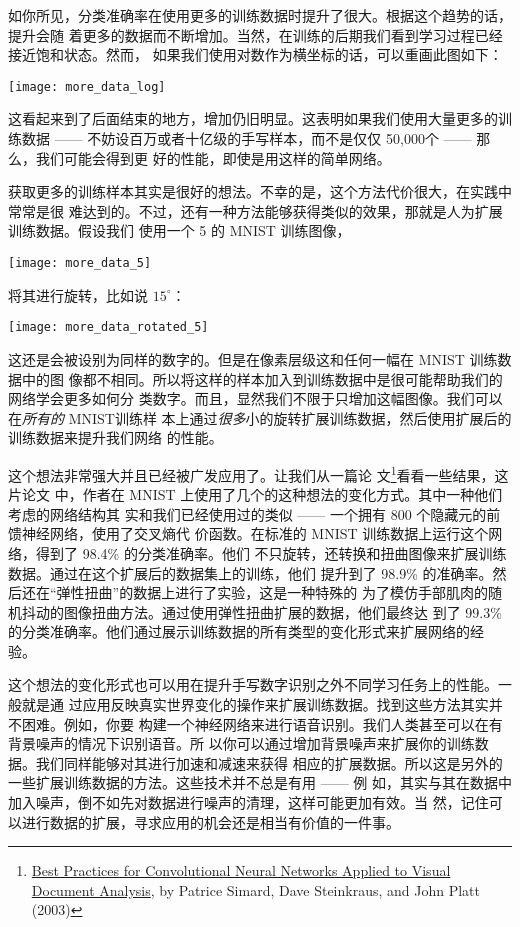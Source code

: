 如你所见，分类准确率在使用更多的训练数据时提升了很大。根据这个趋势的话，提升会随
着更多的数据而不断增加。当然，在训练的后期我们看到学习过程已经接近饱和状态。然而，
如果我们使用对数作为横坐标的话，可以重画此图如下：
\begin{center}
\texttt{[image: more\_data\_log]}
\end{center}

这看起来到了后面结束的地方，增加仍旧明显。这表明如果我们使用大量更多的训练数据
—— 不妨设百万或者十亿级的手写样本，而不是仅仅 50,000个 —— 那么，我们可能会得到更
好的性能，即使是用这样的简单网络。

获取更多的训练样本其实是很好的想法。不幸的是，这个方法代价很大，在实践中常常是很
难达到的。不过，还有一种方法能够获得类似的效果，那就是人为扩展训练数据。假设我们
使用一个 5 的 MNIST 训练图像，
\begin{center}
  \texttt{[image: more\_data\_5]}
\end{center}
将其进行旋转，比如说 $15^{\circ}$：
\begin{center}
  \texttt{[image: more\_data\_rotated\_5]}
\end{center}

这还是会被设别为同样的数字的。但是在像素层级这和任何一幅在 MNIST 训练数据中的图
像都不相同。所以将这样的样本加入到训练数据中是很可能帮助我们的网络学会更多如何分
类数字。而且，显然我们不限于只增加这幅图像。我们可以在\emph{所有的} MNIST训练样
本上通过\emph{很多}小的旋转扩展训练数据，然后使用扩展后的训练数据来提升我们网络
的性能。

这个想法非常强大并且已经被广发应用了。让我们从一篇论
文\footnote{\href{http://dx.doi.org/10.1109/ICDAR.2003.1227801}{Best Practices
    for Convolutional Neural Networks Applied to Visual Document Analysis}, by
  Patrice Simard, Dave Steinkraus, and John Platt (2003)}看看一些结果，这片论文
中，作者在 MNIST 上使用了几个的这种想法的变化方式。其中一种他们考虑的网络结构其
实和我们已经使用过的类似 —— 一个拥有 800 个隐藏元的前馈神经网络，使用了交叉熵代
价函数。在标准的 MNIST 训练数据上运行这个网络，得到了 98.4\% 的分类准确率。他们
不只旋转，还转换和扭曲图像来扩展训练数据。通过在这个扩展后的数据集上的训练，他们
提升到了 98.9\% 的准确率。然后还在“弹性扭曲”的数据上进行了实验，这是一种特殊的
为了模仿手部肌肉的随机抖动的图像扭曲方法。通过使用弹性扭曲扩展的数据，他们最终达
到了 99.3\% 的分类准确率。他们通过展示训练数据的所有类型的变化形式来扩展网络的经
验。

这个想法的变化形式也可以用在提升手写数字识别之外不同学习任务上的性能。一般就是通
过应用反映真实世界变化的操作来扩展训练数据。找到这些方法其实并不困难。例如，你要
构建一个神经网络来进行语音识别。我们人类甚至可以在有背景噪声的情况下识别语音。所
以你可以通过增加背景噪声来扩展你的训练数据。我们同样能够对其进行加速和减速来获得
相应的扩展数据。所以这是另外的一些扩展训练数据的方法。这些技术并不总是有用 —— 例
如，其实与其在数据中加入噪声，倒不如先对数据进行噪声的清理，这样可能更加有效。当
然，记住可以进行数据的扩展，寻求应用的机会还是相当有价值的一件事。

